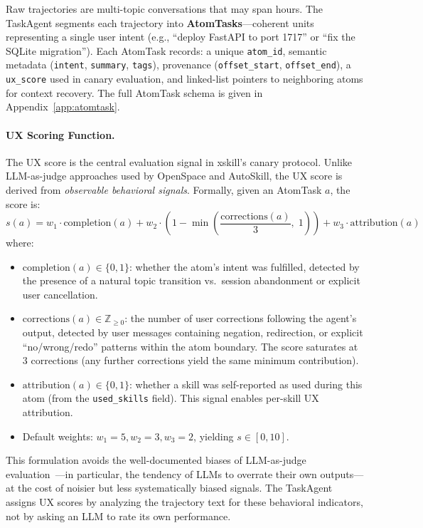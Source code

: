 \documentclass[11pt]{article}
\begin{document}
Raw trajectories are multi-topic conversations that may span hours. The TaskAgent segments each trajectory into \textbf{AtomTasks}---coherent units representing a single user intent (e.g., ``deploy FastAPI to port 1717'' or ``fix the SQLite migration''). Each AtomTask records: a unique \texttt{atom\_id}, semantic metadata (\texttt{intent}, \texttt{summary}, \texttt{tags}), provenance (\texttt{offset\_start}, \texttt{offset\_end}), a \texttt{ux\_score} used in canary evaluation, and linked-list pointers to neighboring atoms for context recovery. The full AtomTask schema is given in Appendix~\ref{app:atomtask}.

\paragraph{UX Scoring Function.} The UX score is the central evaluation signal in xskill's canary protocol. Unlike LLM-as-judge approaches used by OpenSpace and AutoSkill, the UX score is derived from \emph{observable behavioral signals}. Formally, given an AtomTask $a$, the score is:
\begin{equation}
\label{eq:ux}
s(a) = w_1 \cdot \mathrm{completion}(a) + w_2 \cdot \left(1 - \min\!\left(\frac{\mathrm{corrections}(a)}{3},\; 1\right)\right) + w_3 \cdot \mathrm{attribution}(a)
\end{equation}
where:
\begin{itemize}
    \item $\mathrm{completion}(a) \in \{0, 1\}$: whether the atom's intent was fulfilled, detected by the presence of a natural topic transition vs.\ session abandonment or explicit user cancellation.
    \item $\mathrm{corrections}(a) \in \mathbb{Z}_{\geq 0}$: the number of user corrections following the agent's output, detected by user messages containing negation, redirection, or explicit ``no/wrong/redo'' patterns within the atom boundary. The score saturates at 3 corrections (any further corrections yield the same minimum contribution).
    \item $\mathrm{attribution}(a) \in \{0, 1\}$: whether a skill was self-reported as used during this atom (from the \texttt{used\_skills} field). This signal enables per-skill UX attribution.
    \item Default weights: $w_1 = 5, w_2 = 3, w_3 = 2$, yielding $s \in [0, 10]$.
\end{itemize}

This formulation avoids the well-documented biases of LLM-as-judge evaluation~\citep{zheng2024judging}---in particular, the tendency of LLMs to overrate their own outputs---at the cost of noisier but less systematically biased signals. The TaskAgent assigns UX scores by analyzing the trajectory text for these behavioral indicators, not by asking an LLM to rate its own performance.
\end{document}
